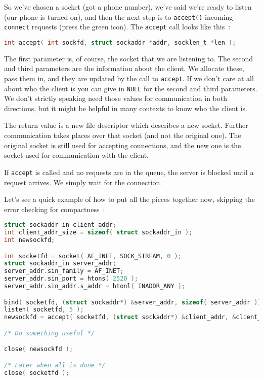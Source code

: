 So we've chosen a socket (got a phone number), we've said we're ready to listen (our phone is turned on), and then the next step is to \texttt{accept()} incoming \texttt{connect} requests (press the green icon). The \texttt{accept} call looks like this~\cite{apunix}:

\begin{lstlisting}[language=C]
int accept( int sockfd, struct sockaddr *addr, socklen_t *len ); 
\end{lstlisting}

The first parameter is, of course, the socket that we are listening to. The second and third parameters are the information about the client. We allocate these, pass them in, and they are updated by the call to \texttt{accept}. If we don't care at all about who the client is you can give in \texttt{NULL} for the second and third parameters. We don't strictly speaking need those values for communication in both directions, but it might be helpful in many contexts to know who the client is.

The return value is a new file descriptor which describes a new socket. Further communication takes places over that socket (and not the original one). The original socket is still used for accepting connections, and the new one is the socket used for communication with the client.

If \texttt{accept} is called and no requests are in the queue, the server is blocked until a request arrives. We simply wait for the connection.

Let's see a quick example of how to put all the pieces together now, skipping the error checking for compactness~\cite{getaddrinfo}:

\begin{lstlisting}[language=C]
struct sockaddr_in client_addr;
int client_addr_size = sizeof( struct sockaddr_in );
int newsockfd;

int socketfd = socket( AF_INET, SOCK_STREAM, 0 );
struct sockaddr_in server_addr;
server_addr.sin_family = AF_INET;
server_addr.sin_port = htons( 2520 );
server_addr.sin_addr.s_addr = htonl( INADDR_ANY );

bind( socketfd, (struct sockaddr*) &server_addr, sizeof( server_addr ));
listen( socketfd, 5 );
newsockfd = accept( socketfd, (struct sockaddr*) &client_addr, &client_addr_size );

/* Do something useful */

close( newsockfd );

/* Later when all is done */
close( socketfd );
\end{lstlisting}

